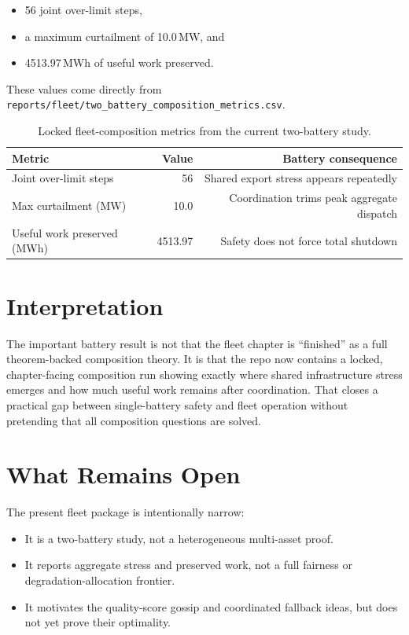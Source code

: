 \begin{itemize}
  \item 56 joint over-limit steps,
  \item a maximum curtailment of 10.0\,MW, and
  \item 4513.97\,MWh of useful work preserved.
\end{itemize}

These values come directly from
\texttt{reports/fleet/two\_battery\_composition\_metrics.csv}.

\begin{table}[ht]
\centering
\caption{Locked fleet-composition metrics from the current two-battery study.}
\label{tab:fleet-results}
\begin{tabular}{lrr}
\toprule
\textbf{Metric} & \textbf{Value} & \textbf{Battery consequence} \\
\midrule
Joint over-limit steps & 56 & Shared export stress appears repeatedly \\
Max curtailment (MW) & 10.0 & Coordination trims peak aggregate dispatch \\
Useful work preserved (MWh) & 4513.97 & Safety does not force total shutdown \\
\bottomrule
\end{tabular}
\end{table}

\section{Interpretation}

The important battery result is not that the fleet chapter is ``finished'' as
a full theorem-backed composition theory.  It is that the repo now contains a
locked, chapter-facing composition run showing exactly where shared
infrastructure stress emerges and how much useful work remains after
coordination.  That closes a practical gap between single-battery safety and
fleet operation without pretending that all composition questions are solved.

\section{What Remains Open}

The present fleet package is intentionally narrow:

\begin{itemize}
  \item It is a two-battery study, not a heterogeneous multi-asset proof.
  \item It reports aggregate stress and preserved work, not a full fairness or
    degradation-allocation frontier.
  \item It motivates the quality-score gossip and coordinated fallback ideas,
    but does not yet prove their optimality.
\end{itemize}

